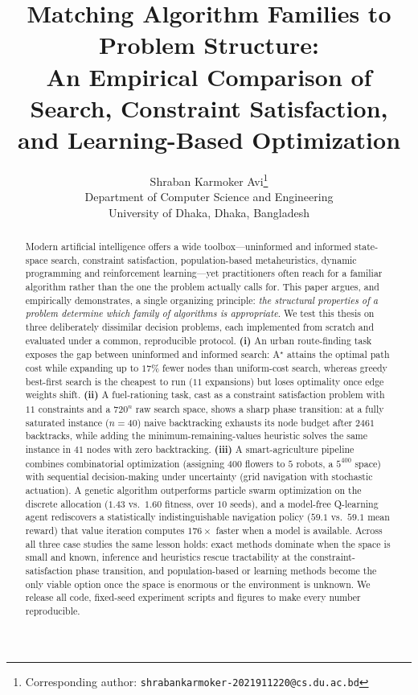 \documentclass[10pt]{article}
\title{\vspace{-1.2em}\textbf{Matching Algorithm Families to Problem Structure:\\
An Empirical Comparison of Search, Constraint Satisfaction,\\
and Learning-Based Optimization}}
\author{%
  \normalsize Shraban Karmoker Avi\thanks{Corresponding author: \texttt{shrabankarmoker-2021911220@cs.du.ac.bd}}\\[2pt]
  \small Department of Computer Science and Engineering\\
  \small University of Dhaka, Dhaka, Bangladesh
}
\date{}
\begin{document}
\maketitle

\begin{abstract}
\noindent
Modern artificial intelligence offers a wide toolbox---uninformed and informed
state-space search, constraint satisfaction, population-based metaheuristics,
dynamic programming and reinforcement learning---yet practitioners often reach
for a familiar algorithm rather than the one the problem actually calls for.
This paper argues, and empirically demonstrates, a single organizing principle:
\emph{the structural properties of a problem determine which family of algorithms
is appropriate}. We test this thesis on three deliberately dissimilar decision
problems, each implemented from scratch and evaluated under a common,
reproducible protocol. \textbf{(i)} An urban route-finding task exposes the gap
between uninformed and informed search: A$^\star$ attains the optimal path cost
while expanding up to $17\%$ fewer nodes than uniform-cost search, whereas greedy
best-first search is the cheapest to run ($11$ expansions) but loses optimality
once edge weights shift. \textbf{(ii)} A fuel-rationing task, cast as a
constraint satisfaction problem with $11$ constraints and a $720^{n}$ raw search
space, shows a sharp phase transition: at a fully saturated instance ($n{=}40$)
naive backtracking exhausts its node budget after $2461$ backtracks, while adding
the minimum-remaining-values heuristic solves the same instance in $41$ nodes
with zero backtracking. \textbf{(iii)} A smart-agriculture pipeline combines
combinatorial optimization (assigning $400$ flowers to $5$ robots, a $5^{400}$
space) with sequential decision-making under uncertainty (grid navigation with
stochastic actuation). A genetic algorithm outperforms particle swarm
optimization on the discrete allocation ($1.43$ vs.\ $1.60$ fitness, over $10$
seeds), and a model-free Q-learning agent rediscovers a statistically
indistinguishable navigation policy ($59.1$ vs.\ $59.1$ mean reward) that value
iteration computes $176\times$ faster when a model is available. Across all three case studies the same lesson
holds: exact methods dominate when the space is small and known, inference and
heuristics rescue tractability at the constraint-satisfaction phase transition,
and population-based or learning methods become the only viable option once the
space is enormous or the environment is unknown. We release all code, fixed-seed
experiment scripts and figures to make every number reproducible.
\end{abstract}
\end{document}
